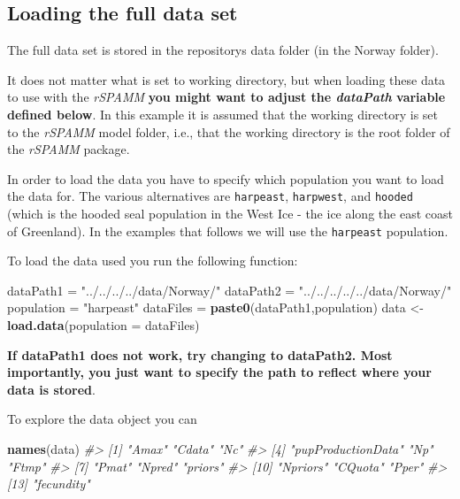 \documentclass[
]{article}
\newenvironment{Shaded}{\begin{snugshade}}{\end{snugshade}}
\newcommand{\CommentTok}[1]{\textcolor[rgb]{0.56,0.35,0.01}{\textit{#1}}}
\newcommand{\DataTypeTok}[1]{\textcolor[rgb]{0.13,0.29,0.53}{#1}}
\newcommand{\KeywordTok}[1]{\textcolor[rgb]{0.13,0.29,0.53}{\textbf{#1}}}
\newcommand{\NormalTok}[1]{#1}
\newcommand{\StringTok}[1]{\textcolor[rgb]{0.31,0.60,0.02}{#1}}
\begin{document}
\hypertarget{loading-the-full-data-set}{%
\subsection{Loading the full data set}\label{loading-the-full-data-set}}

The full data set is stored in the repositorys data folder (in the
Norway folder).

It does not matter what is set to working directory, but when loading
these data to use with the \emph{rSPAMM} \textbf{you might want to
adjust the \emph{dataPath} variable defined below}. In this example it
is assumed that the working directory is set to the \emph{rSPAMM} model
folder, i.e., that the working directory is the root folder of the
\emph{rSPAMM} package.

In order to load the data you have to specify which population you want
to load the data for. The various alternatives are \texttt{harpeast},
\texttt{harpwest}, and \texttt{hooded} (which is the hooded seal
population in the West Ice - the ice along the east coast of Greenland).
In the examples that follows we will use the \texttt{harpeast}
population.

To load the data used you run the following function:

\begin{Shaded}
\begin{Highlighting}[]
\NormalTok{dataPath1 =}\StringTok{ "../../../../data/Norway/"}
\NormalTok{dataPath2 =}\StringTok{ "../../../../../data/Norway/"}
\NormalTok{population =}\StringTok{ "harpeast"}
\NormalTok{dataFiles =}\StringTok{ }\KeywordTok{paste0}\NormalTok{(dataPath1,population)}
\NormalTok{data <-}\StringTok{ }\KeywordTok{load.data}\NormalTok{(}\DataTypeTok{population =}\NormalTok{ dataFiles)}
\end{Highlighting}
\end{Shaded}

\textbf{If dataPath1 does not work, try changing to dataPath2. Most
importantly, you just want to specify the path to reflect where your
data is stored}.

To explore the data object you can

\begin{Shaded}
\begin{Highlighting}[]
\KeywordTok{names}\NormalTok{(data)}
\CommentTok{#>  [1] "Amax"              "Cdata"             "Nc"               }
\CommentTok{#>  [4] "pupProductionData" "Np"                "Ftmp"             }
\CommentTok{#>  [7] "Pmat"              "Npred"             "priors"           }
\CommentTok{#> [10] "Npriors"           "CQuota"            "Pper"             }
\CommentTok{#> [13] "fecundity"}
\end{Highlighting}
\end{Shaded}
\end{document}
